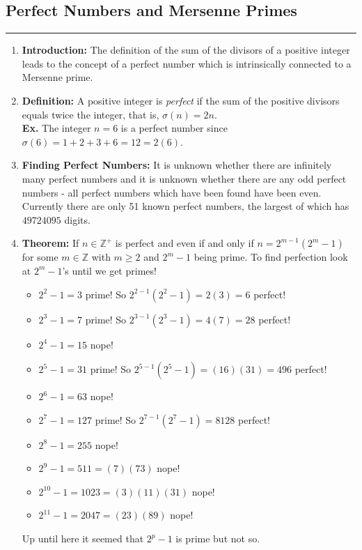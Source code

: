 \documentclass[class=article, crop=false]{standalone}
\def\integers{{\mathbb Z}}
\begin{document}
\subsection{Perfect Numbers and Mersenne Primes}
\rule{\textwidth}{1pt}
\begin{enumerate}
\item \textbf{Introduction:} The definition of the sum of the divisors of a positive integer
leads to the concept of a perfect number which is intrinsically connected to a Mersenne prime.

\item \textbf{Definition:} A positive integer is \emph{perfect} if the sum of the positive
divisors equals twice the integer, that is, $\sigma(n) = 2n$.\\
\textbf{Ex.} The integer $n=6$ is a perfect number since $\sigma(6) = 1+2+3+6=12=2(6)$.

\item \textbf{Finding Perfect Numbers:} It is unknown whether there are infinitely many
perfect numbers and it is unknown whether there are any odd perfect numbers - all perfect numbers
which have been found have been even. Currently there are only 51 known perfect numbers,
the largest of which has $49724095$ digits. 

\item \textbf{Theorem:} If $n\in\integers^+$ is perfect and even if and only if
$n=2^{m-1}(2^m - 1)$ for some $m\in\integers$ with $m\geq 2$ and $2^m-1$ being prime.
To find perfection look at $2^m - 1$'s until we get primes!
\begin{itemize}
	\item $2^{2}-1=3$ prime! So $2^{2-1} (2^2 -1)=2(3)=6$ perfect!
	\item $2^3 -1 =7$ prime! So $2^{3-1} (2^3 -1)=4(7)=28$ perfect!
	\item $2^4 -1 =15$ nope!
	\item $2^5 -1 =31$ prime! So $2^{5-1} (2^5 -1)=(16)(31)=496$ perfect!
	\item $2^6-1 =63$ nope!
	\item $2^7 -1=127$ prime! So $2^{7-1} (2^7 -1)=8128$ perfect!
	\item $2^8 -1=255$ nope!
	\item $2^9 -1=511=(7)(73)$ nope!
	\item $2^{10}-1=1023=(3)(11)(31)$ nope!
	\item $2^{11}-1=2047=(23)(89)$ nope!
\end{itemize}
Up until here it seemed that $2^p -1$ is prime but not so.


\end{enumerate}
\end{document}
